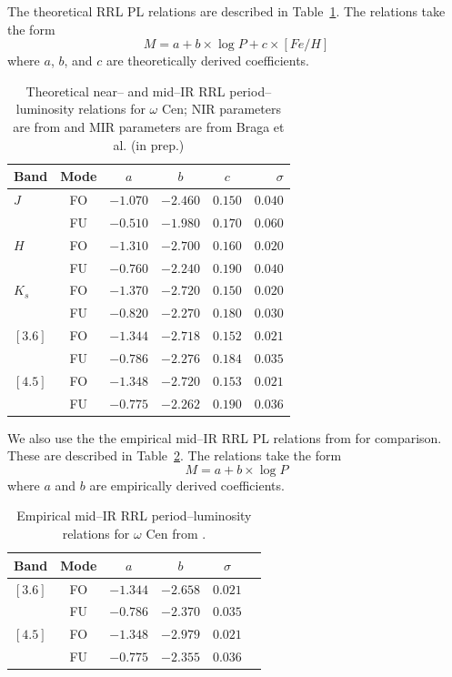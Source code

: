 \documentclass[a4paper,fleqn,usenatbib]{mnras}
\begin{document}
The theoretical RRL PL relations are described in Table~\ref{tab:pl_table_theo}. The relations take the form
\begin{equation}M = a + b\times\log P + c\times[Fe/H]\end{equation}
where $a$, $b$, and $c$ are theoretically derived coefficients.
\begin{table}
\centering
\caption{Theoretical near-- and mid--IR RRL period--luminosity relations for $\omega$ Cen; NIR parameters are from \citet{2015ApJ...808...50M} and MIR parameters are from Braga et al. (in prep.)}
\label{tab:pl_table_theo}
\begin{tabular}{l||c|c|c|c|r} 
\hline \hline
Band & Mode & $a$   & $b$   & $c$   & $\sigma$ \\
\hline
$J$ & FO & $-1.070$ & $-2.460$ & $0.150$ & $0.040$ \\
       & FU & $-0.510$ & $-1.980$ & $0.170$ & $0.060$ \\
$H$ & FO & $-1.310$ & $-2.700$ & $0.160$ & $0.020$\\
       & FU & $-0.760$ & $-2.240$ & $0.190$ & $0.040$\\
$K_s$ & FO & $-1.370$ & $-2.720$ & $0.150$ & $0.020$ \\
       & FU & $-0.820$ & $-2.270$ & $0.180$ & $0.030$\\
$[3.6]$ & FO & $-1.344$ & $-2.718$ & $0.152$ & $0.021$ \\
            & FU & $-0.786$ & $-2.276$ & $0.184$ & $0.035$ \\
$[4.5]$ & FO & $-1.348$ & $-2.720$ & $0.153$ & $0.021$ \\         
            & FU & $-0.775$ & $-2.262$ & $0.190$ & $0.036$ \\
            \hline
\end{tabular}
\end{table}


We also use the the empirical mid--IR RRL PL relations from \citet{2015arXiv150507858N} for comparison. These are described in Table~\ref{tab:pl_table_m4}. The relations take the form
\begin{equation}M = a + b\times\log P \end{equation}
where $a$ and $b$ are empirically derived coefficients.

\begin{table}
\centering
\caption{Empirical mid--IR RRL period--luminosity relations for $\omega$ Cen from \citet{2015arXiv150507858N}.} 
\label{tab:pl_table_m4}
\begin{tabular}{l||c|c|c|c|r} 
\hline \hline
Band & Mode & $a$   & $b$  & $\sigma$ \\
\hline
$[3.6]$ & FO & $-1.344$ & $-2.658$ & $0.021$ \\
            & FU & $-0.786$ & $-2.370$ & $0.035$ \\
$[4.5]$ & FO & $-1.348$ & $-2.979$ & $0.021$ \\         
            & FU & $-0.775$ & $-2.355$ & $0.036$ \\
            \hline
\end{tabular}
\end{table}
\end{document}
